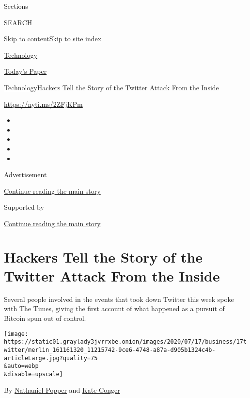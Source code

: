 Sections

SEARCH

\protect\hyperlink{site-content}{Skip to
content}\protect\hyperlink{site-index}{Skip to site index}

\href{https://www.nytimes3xbfgragh.onion/section/technology}{Technology}

\href{https://myaccount.nytimes3xbfgragh.onion/auth/login?response_type=cookie\&client_id=vi}{}

\href{https://www.nytimes3xbfgragh.onion/section/todayspaper}{Today's
Paper}

\href{/section/technology}{Technology}\textbar{}Hackers Tell the Story
of the Twitter Attack From the Inside

\url{https://nyti.ms/2ZFjKPm}

\begin{itemize}
\item
\item
\item
\item
\item
\end{itemize}

Advertisement

\protect\hyperlink{after-top}{Continue reading the main story}

Supported by

\protect\hyperlink{after-sponsor}{Continue reading the main story}

\hypertarget{hackers-tell-the-story-of-the-twitter-attack-from-the-inside}{%
\section{Hackers Tell the Story of the Twitter Attack From the
Inside}\label{hackers-tell-the-story-of-the-twitter-attack-from-the-inside}}

Several people involved in the events that took down Twitter this week
spoke with The Times, giving the first account of what happened as a
pursuit of Bitcoin spun out of control.

\texttt{[image: https://static01.graylady3jvrrxbe.onion/images/2020/07/17/business/17twitter/merlin\_161161320\_11215742-9ce6-4748-a87a-d905b1324c4b-articleLarge.jpg?quality=75\\\&auto=webp\\\&disable=upscale]}

By
\href{https://www.nytimes3xbfgragh.onion/by/nathaniel-popper}{Nathaniel
Popper} and
\href{https://www.nytimes3xbfgragh.onion/by/kate-conger}{Kate Conger}

